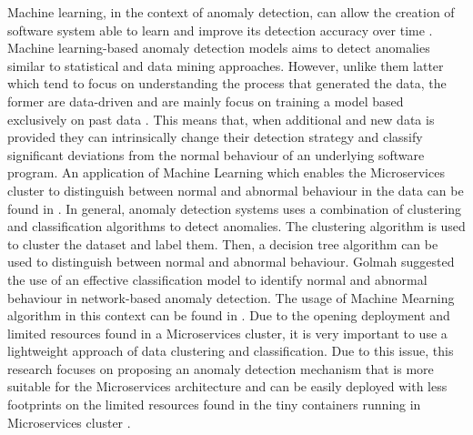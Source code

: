 Machine learning, in the context of  anomaly detection, can allow the creation of  software system able to learn and improve its detection accuracy over time \cite{bujlow2012method}.
Machine learning-based anomaly detection models aims to detect anomalies similar to statistical and data mining approaches. However, unlike them latter which tend to focus on understanding the process that generated the data, the former are data-driven and are mainly focus on training a model based exclusively on past data \cite{Patcha:2007hja}. This means that, when additional and new data is provided they can intrinsically change their detection strategy and classify significant deviations from the normal behaviour of an underlying software program.
An application of Machine Learning which enables the Microservices cluster to distinguish between normal and abnormal behaviour in the data can be found in \cite{Buczak:2016kt}. 
In general, anomaly detection systems uses a combination of clustering and classification algorithms to detect anomalies. The clustering algorithm is used to cluster the dataset and label them. Then, a decision tree algorithm can be used to distinguish between normal and abnormal behaviour.
Golmah \cite{golmah2014efficient} suggested the use of an effective classification model to identify normal and abnormal behaviour in network-based anomaly detection. The usage of Machine Mearning algorithm  in this context can be found in  \cite{golmah2014efficient,haq2015application,Buczak:2016kt}. Due to the  opening deployment and limited resources found in a Microservices cluster, it is very important to use a lightweight approach of data clustering and classification. Due to this issue, this research focuses on proposing an anomaly detection mechanism that is more suitable for the Microservices architecture and can be easily deployed with less footprints on the limited resources found in the tiny containers running in Microservices cluster . 

